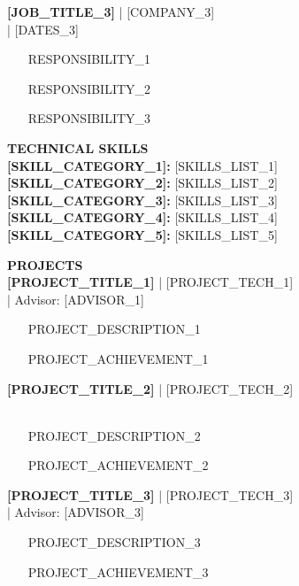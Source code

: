 \documentclass[11pt,a4paper]{article}
\begin{document}
\textbf{[JOB_TITLE\_3]} | [COMPANY\_3]\\
[LOCATION\_3] | [DATES\_3]\\
\begin{itemize}[leftmargin=*,noitemsep,topsep=2pt]
    \item [RESPONSIBILITY\_1]
    \item [RESPONSIBILITY\_2]
    \item [RESPONSIBILITY\_3]
\end{itemize}

\vspace{6pt}

\textbf{\large TECHNICAL SKILLS}\\
\textbf{[SKILL_CATEGORY\_1]:} [SKILLS_LIST\_1]\\
\textbf{[SKILL_CATEGORY\_2]:} [SKILLS_LIST\_2]\\
\textbf{[SKILL_CATEGORY\_3]:} [SKILLS_LIST\_3]\\
\textbf{[SKILL_CATEGORY\_4]:} [SKILLS_LIST\_4]\\
\textbf{[SKILL_CATEGORY\_5]:} [SKILLS_LIST\_5]\\

\vspace{6pt}

\textbf{\large PROJECTS}\\
\textbf{[PROJECT\_TITLE\_1]} | [PROJECT\_TECH\_1]\\
[PROJECT_DATES\_1] | Advisor: [ADVISOR\_1]\\
\begin{itemize}[leftmargin=*,noitemsep,topsep=2pt]
    \item [PROJECT_DESCRIPTION\_1]
    \item [PROJECT_ACHIEVEMENT\_1]
\end{itemize}

\textbf{[PROJECT\_TITLE\_2]} | [PROJECT\_TECH\_2]\\
[PROJECT\_DATES\_2]\\
\begin{itemize}[leftmargin=*,noitemsep,topsep=2pt]
    \item [PROJECT\_DESCRIPTION\_2]
    \item [PROJECT\_ACHIEVEMENT\_2]
\end{itemize}

\textbf{[PROJECT_TITLE\_3]} | [PROJECT_TECH\_3]\\
[PROJECT_DATES\_3] | Advisor: [ADVISOR\_3]\\
\begin{itemize}[leftmargin=*,noitemsep,topsep=2pt]
    \item [PROJECT_DESCRIPTION\_3]
    \item [PROJECT_ACHIEVEMENT\_3]
\end{itemize}
\end{document}

